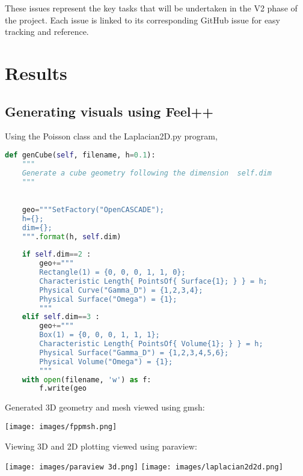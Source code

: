 \documentclass[12pt]{article}
\begin{document}
These issues represent the key tasks that will be undertaken in the V2 phase of the project. Each issue is linked to its corresponding GitHub issue for easy tracking and reference.

\newpage

\section{Results}
\subsection{Generating visuals using Feel++}

Using the Poisson class and the Laplacian2D.py program,


\begin{lstlisting}[language=Python,caption={},frame=single, backgroundcolor=\color{gray!10}, basicstyle=\footnotesize,rulecolor=\color{blue}, framexleftmargin=3pt, commentstyle=\color{mygreen}, keywordstyle=\color{blue}]
def genCube(self, filename, h=0.1):
    """
    Generate a cube geometry following the dimension  self.dim
    """

    
    geo="""SetFactory("OpenCASCADE");
    h={};
    dim={};
    """.format(h, self.dim)
    
    if self.dim==2 :
        geo+="""
        Rectangle(1) = {0, 0, 0, 1, 1, 0};
        Characteristic Length{ PointsOf{ Surface{1}; } } = h;
        Physical Curve("Gamma_D") = {1,2,3,4};
        Physical Surface("Omega") = {1};
        """
    elif self.dim==3 :
        geo+="""
        Box(1) = {0, 0, 0, 1, 1, 1};
        Characteristic Length{ PointsOf{ Volume{1}; } } = h;
        Physical Surface("Gamma_D") = {1,2,3,4,5,6};
        Physical Volume("Omega") = {1};
        """
    with open(filename, 'w') as f:
        f.write(geo
\end{lstlisting}

Generated 3D geometry and mesh viewed using gmsh:

\begin{frame}{}
        \texttt{[image: images/fppmsh.png]}
\end{frame}


Viewing 3D and 2D plotting viewed using paraview:

\begin{frame}{}
    \begin{center}
        \texttt{[image: images/paraview 3d.png]}
        \texttt{[image: images/laplacian2d2d.png]}
    \end{center}
\end{frame}
\end{document}
